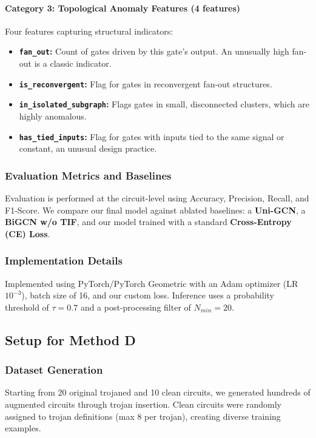 \documentclass[conference]{IEEEtran}
\begin{document}
\paragraph{Category 3: Topological Anomaly Features (4 features)}
Four features capturing structural indicators:
\begin{itemize}
    \item \textbf{\texttt{fan\_out}:} Count of gates driven by this gate's output. An unusually high fan-out is a classic indicator.
    \item \textbf{\texttt{is\_reconvergent}:} Flag for gates in reconvergent fan-out structures.
    \item \textbf{\texttt{in\_isolated\_subgraph}:} Flags gates in small, disconnected clusters, which are highly anomalous.
    \item \textbf{\texttt{has\_tied\_inputs}:} Flag for gates with inputs tied to the same signal or constant, an unusual design practice.
\end{itemize}

\subsubsection{Evaluation Metrics and Baselines}
Evaluation is performed at the circuit-level using Accuracy, Precision, Recall, and F1-Score. We compare our final model against ablated baselines: a \textbf{Uni-GCN}, a \textbf{BiGCN w/o TIF}, and our model trained with a standard \textbf{Cross-Entropy (CE) Loss}.

\subsubsection{Implementation Details}
Implemented using PyTorch/PyTorch Geometric with an Adam optimizer (LR $10^{-3}$), batch size of 16, and our custom loss. Inference uses a probability threshold of $\tau=0.7$ and a post-processing filter of $N_{min}=20$.

\subsection{Setup for Method D}
\subsubsection{Dataset Generation}
Starting from 20 original trojaned and 10 clean circuits, we generated hundreds of augmented circuits through trojan insertion. Clean circuits were randomly assigned to trojan definitions (max 8 per trojan), creating diverse training examples.
\end{document}
